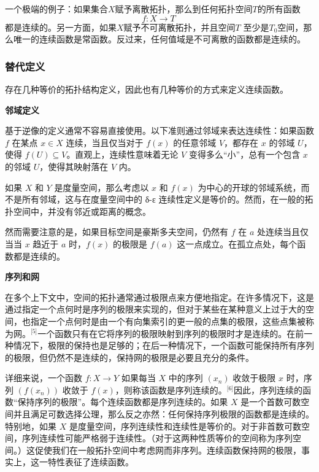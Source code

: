 一个极端的例子：如果集合$X$赋予离散拓扑，那么到任何拓扑空间$T$的所有函数
$$
f \colon X \rightarrow T~
$$
都是连续的。另一方面，如果$X$赋予不可离散拓扑，并且空间$T$ 至少是$T_0$空间，那么唯一的连续函数是常函数。反过来，任何值域是不可离散的函数都是连续的。
\subsubsection{替代定义}
存在几种等价的拓扑结构定义，因此也有几种等价的方式来定义连续函数。

\textbf{邻域定义}

基于逆像的定义通常不容易直接使用。以下准则通过邻域来表达连续性：如果函数 $f$ 在某点 $x \in X$ 连续，当且仅当对于 $f(x)$ 的任意邻域 $V$，都存在 $x$ 的邻域 $U$，使得 $f(U) \subseteq V$。直观上，连续性意味着无论 $V$ 变得多么“小”，总有一个包含 $x$ 的邻域 $U$，使得其映射落在 $V$ 内。

如果 $X$ 和 $Y$ 是度量空间，那么考虑以 $x$ 和 $f(x)$ 为中心的开球的邻域系统，而不是所有邻域，这与在度量空间中的 δ-ε 连续性定义是等价的。然而，在一般的拓扑空间中，并没有邻近或距离的概念。

然而需要注意的是，如果目标空间是豪斯多夫空间，仍然有 $f$ 在 $a$ 处连续当且仅当当 $x$ 趋近于 $a$ 时，$f(x)$ 的极限是 $f(a)$ 这一点成立。在孤立点处，每个函数都是连续的。

\textbf{序列和网}

在多个上下文中，空间的拓扑通常通过极限点来方便地指定。在许多情况下，这是通过指定一个点何时是序列的极限来实现的，但对于某些在某种意义上过于大的空间，也指定一个点何时是由一个有向集索引的更一般的点集的极限，这些点集被称为网。\(^\text{[5]}\)一个函数只有在它将序列的极限映射到序列的极限时才是连续的。在前一种情况下，极限的保持也是足够的；在后一种情况下，一个函数可能保持所有序列的极限，但仍然不是连续的，保持网的极限是必要且充分的条件。

详细来说，一个函数 $f: X \rightarrow Y$ 如果每当 $X$ 中的序列 $(x_n)$ 收敛于极限 $x$ 时，序列 $(f(x_n))$ 收敛于 $f(x)$，则称该函数是序列连续的。\(^\text{[6]}\)因此，序列连续的函数“保持序列的极限”。每个连续函数都是序列连续的。如果 $X$ 是一个首数可数空间并且满足可数选择公理，那么反之亦然：任何保持序列极限的函数都是连续的。特别地，如果 $X$ 是度量空间，序列连续性和连续性是等价的。对于非首数可数空间，序列连续性可能严格弱于连续性。（对于这两种性质等价的空间称为序列空间。）这促使我们在一般拓扑空间中考虑网而非序列。连续函数保持网的极限，事实上，这一特性表征了连续函数。
